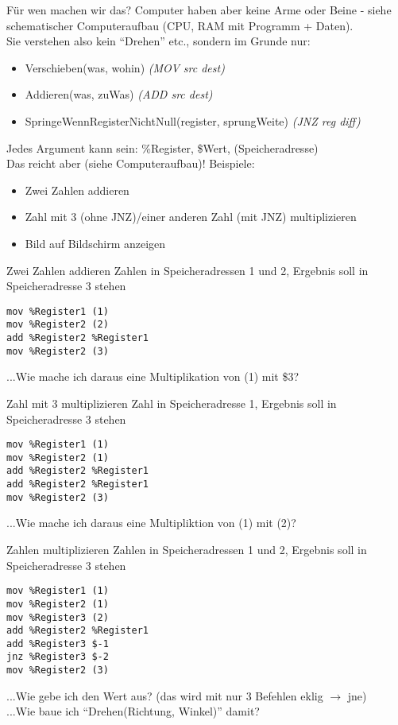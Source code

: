 \documentclass[aspectratio=169,t]{beamer}
\begin{document}
\begin{frame}{Für wen machen wir das?}
	Computer haben aber keine Arme oder Beine - siehe schematischer Computeraufbau (CPU, RAM mit Programm + Daten).\\
	Sie verstehen also kein ``Drehen'' etc., sondern im Grunde nur:
	\begin{itemize}
		\item Verschieben(was, wohin) \textit{(MOV src dest)}
		\item Addieren(was, zuWas) \textit{(ADD src dest)}
		\item SpringeWennRegisterNichtNull(register, sprungWeite) \textit{(JNZ reg diff)}
	\end{itemize}
	Jedes Argument kann sein: \%Register, \$Wert, (Speicheradresse)\\
	Das reicht aber (siehe Computeraufbau)! Beispiele:
	\begin{itemize}
		\item Zwei Zahlen addieren
		\item Zahl mit 3 (ohne JNZ)/einer anderen Zahl (mit JNZ) multiplizieren
		\item Bild auf Bildschirm anzeigen
	\end{itemize}
\end{frame}

\begin{frame}[t,fragile]{Zwei Zahlen addieren}
	Zahlen in Speicheradressen 1 und 2, Ergebnis soll in Speicheradresse 3 stehen
	\lstset{language=[x86masm]Assembler,texcl=true}
	\begin{lstlisting}
mov %Register1 (1)
mov %Register2 (2)
add %Register2 %Register1
mov %Register2 (3)
	\end{lstlisting}
	...Wie mache ich daraus eine Multiplikation von (1) mit \$3?
\end{frame}

\begin{frame}[t,fragile]{Zahl mit 3 multiplizieren}
	Zahl in Speicheradresse 1, Ergebnis soll in Speicheradresse 3 stehen
	\lstset{language=[x86masm]Assembler,texcl=true}
	\begin{lstlisting}
mov %Register1 (1)
mov %Register2 (1)
add %Register2 %Register1
add %Register2 %Register1
mov %Register2 (3)
	\end{lstlisting}
	...Wie mache ich daraus eine Multipliktion von (1) mit (2)?
\end{frame}

\begin{frame}[t,fragile]{Zahlen multiplizieren}
	Zahlen in Speicheradressen 1 und 2, Ergebnis soll in Speicheradresse 3 stehen
	\lstset{language=[x86masm]Assembler,texcl=true}
	\begin{lstlisting}
mov %Register1 (1)
mov %Register2 (1)
mov %Register3 (2)
add %Register2 %Register1
add %Register3 $-1
jnz %Register3 $-2
mov %Register2 (3)
	\end{lstlisting}
	...Wie gebe ich den Wert aus? (das wird mit nur 3 Befehlen eklig $\rightarrow$ jne)\\
	...Wie baue ich ``Drehen(Richtung, Winkel)'' damit?
\end{frame}
\end{document}
